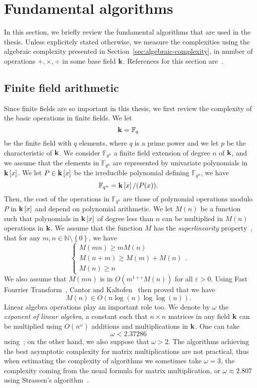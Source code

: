 \section{Fundamental algorithms}
\label{sec:fundamental-algos}

In this section, we briefly review the fundamental algorithms that are used in
the thesis. Unless explicitely stated otherwise, we measure the complexities
using the algebraic complexity presented in
Section~\ref{sec:algebraic-complexity}, \ie in number of operations $+, \times,
\div$ in some base field $\mathbf{k}$. References for this section are~\cite{GG13,
BCGLLSS17, BDDFS17}.

\subsection{Finite field arithmetic}

Since finite fields are so important in this thesis, we first review the
complexity of the basic operations in finite fields. We let
\[
  \mathbf{k} = \mathbb{F}_q
\]
be the finite field with $q$ elements, where $q$ is a prime power and we let $p$
be the characteristic of $\mathbf{k}$. We consider $\mathbb{F}_{q^n}$ a finite field
extension of degree $n$ of $\mathbf{k}$, and we assume that the elements in
$\mathbb{F}_{q^n}$ are represented by univariate polynomials in $\mathbf{k}\left[ x
\right]$. We let $P\in\mathbf{k}\left[ x \right]$ be the irreducible polynomial
defining $\mathbb{F}_{q^n}$, \ie we have
\[
  \mathbb{F}_{q^n} = \mathbf{k}\left[ x \right]/(P(x)).
\]
Then, the cost of the operations in $\mathbb{F}_{q^n}$ are those of polynomial
operations modulo $P$ in $\mathbf{k}\left[ x \right]$ and depend on polynomial
arithmetic. We let $M(n)$ be a function such that polynomials in $\mathbf{k}\left[ x
\right]$ of degree less than $n$ can be multiplied in $M(n)$ operations in $\mathbf{k}$.
We assume that the function $M$ has the \emph{superlinearity}
property~\cite[Chapter 8.3]{GG13}, \ie that for any $m,
n\in\mathbb{N}\setminus\left\{ 0 \right\}$, we have
\[
  \left\{
  \begin{array}{l}
    M(mn) \geq mM(n) \\
    M(n+m)\geq M(m) + M(n) \\
    M(n) \geq n
  \end{array}
  \right.
.\]
We also assume that $M(mn)$ is in $O(m^{1+\varepsilon}M(n))$ for all
$\varepsilon>0$. Using Fast Fourrier Transform~\cite{CT65, SS71}, Cantor and
Kaltofen~\cite{CK91} then proved that we have
\[
  M(n)\in O(n\log(n)\log\log(n)).
\]
Linear algebra operations play an important role too. We denote by $\omega$ the
\emph{exponent of linear algebra}, \ie a constant such that $n\times n$ matrices
in any field $\mathbf{k}$ can be multiplied using $O(n^\omega)$ additions and
multiplications in $\mathbf{k}$. One can take
\[
  \omega < 2.37286
\]
using~\cite{AW21}; on the other hand, we also suppose that $\omega >2$. The
algorithms achieving the best asymptotic complexity for matrix multiplications
are not practical, thus when estimating the complexity of algorithms we
sometimes take $\omega=3$, the complexity coming from the usual formula for
matrix multiplication, or $\omega\approx 2.807$ using Strassen's
algorithm~\cite{Strassen69}.


